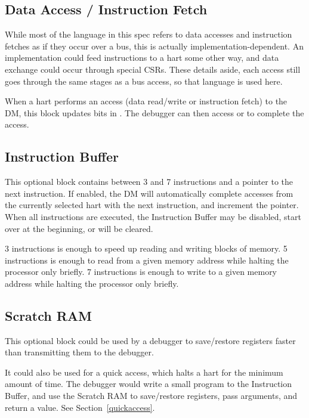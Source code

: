 \documentclass{article}
\begin{document}


\subsection{Data Access / Instruction Fetch}

While most of the language in this spec refers to data accesses and instruction
fetches as if they occur over a bus, this is actually implementation-dependent.
An implementation could feed instructions to a hart some other way, and data
exchange could occur through special CSRs. These details aside, each access
still goes through the same stages as a bus access, so that language is used
here.

When a hart performs an access (data read/write or instruction fetch) to the
DM, this block updates bits in \Raccess. The debugger can then access \Rdaccess
or \Rifetch to complete the access.

\subsection{Instruction Buffer}

This optional block contains between 3 and 7 instructions and a pointer to the
next instruction. If enabled, the DM will automatically complete accesses from
the currently selected hart with the next instruction, and increment the
pointer. When all instructions are executed, the Instruction Buffer may be
disabled, start over at the beginning, or \Fhalt will be cleared.

3 instructions is enough to speed up reading and writing blocks of memory.  5
instructions is enough to read from a given memory address while halting the
processor only briefly.  7 instructions is enough to write to a given memory
address while halting the processor only briefly.

\subsection{Scratch RAM}

This optional block could be used by a debugger to save/restore registers
faster than transmitting them to the debugger.

It could also be used for a quick access, which halts a hart for the minimum
amount of time. The debugger would write a small program to the Instruction
Buffer, and use the Scratch RAM to save/restore registers, pass arguments, and
return a value. See Section~\ref{quickaccess}.
\end{document}
